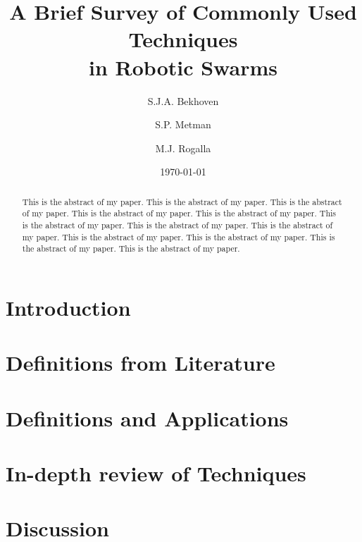 \documentclass[a4paper]{article}
\title{A Brief Survey of Commonly Used Techniques \\ in Robotic Swarms}
\author{S.J.A. Bekhoven  \and
    S.P. Metman \and
    M.J. Rogalla}
\date{\today}
\begin{document}
\maketitle
\thispagestyle{empty}

\begin{abstract}
This is the abstract of my paper.
This is the abstract of my paper.
This is the abstract of my paper.
This is the abstract of my paper.
This is the abstract of my paper.
This is the abstract of my paper.
This is the abstract of my paper.
This is the abstract of my paper.
This is the abstract of my paper.
This is the abstract of my paper.
This is the abstract of my paper.
This is the abstract of my paper.
\end{abstract}


\section{Introduction}
  

\section{Definitions from Literature}
  
  
\section{Definitions and Applications}
  
 
 \section{In-depth review of Techniques}
  

\section{Discussion}
  




\end{document}
